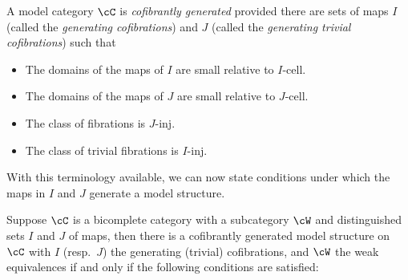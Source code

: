 \documentclass[leqno,oneside,english]{elsarticle}
\begin{document}
{{{\begin{defn*}\label{def:cofibrantly-generated}
  A model category $\cC$ is {\em{cofibrantly generated}} provided
  there are sets of maps $I$ (called the {\em{generating cofibrations}})
  and $J$ (called the {\em{generating trivial cofibrations}}) such that
  \begin{itemize}
  	\item The domains of the maps of $I$ are small relative to
	  $I$-cell.
  	\item The domains of the maps of $J$ are small relative to
	  $J$-cell.
	\item The class of fibrations is $J$-inj.
	\item The class of trivial fibrations is $I$-inj.
  \end{itemize}
\end{defn*}

With this terminology available, we can now state conditions under which
the maps in $I$ and $J$ generate a model structure.
\begin{thm*}{\cite[Thm.~2.1.19]{Hov99}}
  \label{thm:identifying-cofibrantly-generated-model-categories}
  Suppose $\cC$ is a bicomplete category with a subcategory $\cW$ and
  distinguished sets $I$ and $J$ of maps, then there is a cofibrantly
  generated model structure on $\cC$ with $I$ (resp.~$J$) the generating
  (trivial) cofibrations, and $\cW$ the weak equivalences if and only
  if the following conditions are satisfied:
\end{thm*}

}}}
\end{document}
